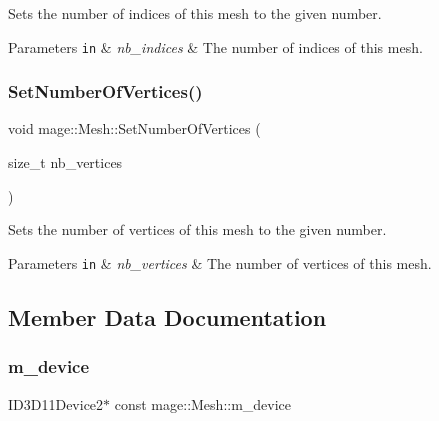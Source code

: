 Sets the number of indices of this mesh to the given number.


\begin{DoxyParams}[1]{Parameters}
\mbox{\tt in}  & {\em nb\+\_\+indices} & The number of indices of this mesh. \\
\hline
\end{DoxyParams}
\hypertarget{classmage_1_1_mesh_a7d871e56f4489e7aa0557688662589bb}{}\label{classmage_1_1_mesh_a7d871e56f4489e7aa0557688662589bb} 
\subsubsection{\texorpdfstring{Set\+Number\+Of\+Vertices()}{SetNumberOfVertices()}}
{\footnotesize\ttfamily void mage\+::\+Mesh\+::\+Set\+Number\+Of\+Vertices (\begin{DoxyParamCaption}\item[{size\+\_\+t}]{nb\+\_\+vertices }\end{DoxyParamCaption})\hspace{0.3cm}{\ttfamily [protected]}}

Sets the number of vertices of this mesh to the given number.


\begin{DoxyParams}[1]{Parameters}
\mbox{\tt in}  & {\em nb\+\_\+vertices} & The number of vertices of this mesh. \\
\hline
\end{DoxyParams}


\subsection{Member Data Documentation}
\hypertarget{classmage_1_1_mesh_ad1d91b6048d73bb05d0d39028d048f18}{}\label{classmage_1_1_mesh_ad1d91b6048d73bb05d0d39028d048f18} 
\subsubsection{\texorpdfstring{m\+\_\+device}{m\_device}}
{\footnotesize\ttfamily I\+D3\+D11\+Device2$\ast$ const mage\+::\+Mesh\+::m\+\_\+device\hspace{0.3cm}{\ttfamily [protected]}}


